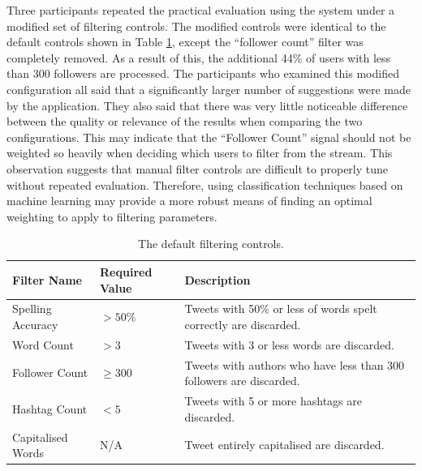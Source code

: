 \documentclass{l4proj}
\begin{document}
Three participants repeated the practical evaluation using the system under a modified set of filtering controls. The modified controls were identical to the default controls shown in Table \ref{table:standardfilters}, except the ``follower count'' filter was completely removed. As a result of this, the additional 44\% of users with less than 300 followers are processed. The participants who examined this modified configuration all said that a significantly larger number of suggestions were made by the application. They also said that there was very little noticeable difference between the quality or relevance of the results when comparing the two configurations. This may indicate that the ``Follower Count'' signal should not be weighted so heavily when deciding which users to filter from the stream. This observation suggests that manual filter controls are difficult to properly tune without repeated evaluation. Therefore, using classification techniques based on machine learning may provide a more robust means of finding an optimal weighting to apply to filtering parameters.
    

   
\begin{table}
    \centering
    \begin{tabular}{| l | l | l |}
    \hline
    Filter Name & Required Value & Description\\ \hline
    Spelling Accuracy & $>50\%$ & Tweets with 50\% or less of words spelt correctly are discarded.  \\ \hline
    Word Count & $>3$ & Tweets with 3 or less words are discarded.  \\ \hline
    Follower Count & $\geq300$ & Tweets with authors who have less than 300 followers are discarded. \\ \hline
    Hashtag Count & $<5$ & Tweets with 5 or more hashtags are discarded. \\ \hline
    Capitalised Words & N/A & Tweet entirely capitalised are discarded. \\
    
    \hline
    \end{tabular}
    \caption{\label{table:standardfilters}The default filtering controls.}
\end{table}

    
\end{document}
